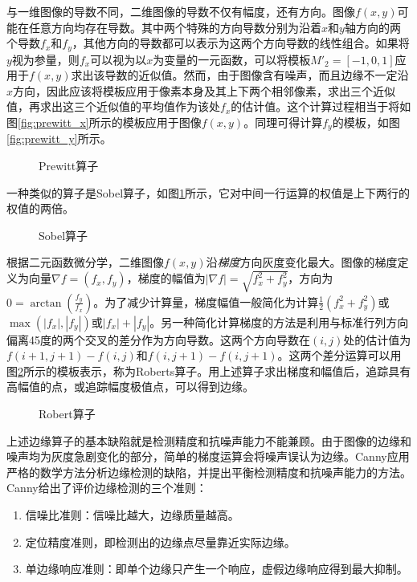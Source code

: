与一维图像的导数不同，二维图像的导数不仅有幅度，还有方向。图像$f(x,y)$可能在任意方向均存在导数。其中两个特殊的方向导数分别为沿着$x$和$y$轴方向的两个导数$f_x$和$f_y$，其他方向的导数都可以表示为这两个方向导数的线性组合。如果将$y$视为参量，则$f_x$可以视为以$x$为变量的一元函数，可以将模板$M'_2=[-1,0,1]$应用于$f(x,y)$求出该导数的近似值。然而，由于图像含有噪声，而且边缘不一定沿$x$方向，因此应该将模板应用于像素本身及其上下两个相邻像素，求出三个近似值，再求出这三个近似值的平均值作为该处$f_x$的估计值。这个计算过程相当于将如图\ref{fig:prewitt_x}所示的模板应用于图像$f(x,y)$。同理可得计算$f_y$的模板，如图\ref{fig:prewitt_y}所示。
\begin{figure}[!h]
  \centering
  \hspace{1cm}
  \caption{Prewitt算子}
\end{figure}
一种类似的算子是Sobel算子，如图\ref{fig:sobel}所示，它对中间一行运算的权值是上下两行的权值的两倍。
\begin{figure}[!h]
  \centering
  \hspace{1cm}
  \caption{Sobel算子}
  \label{fig:sobel}
\end{figure}

根据二元函数微分学，二维图像$f(x,y)$沿\emph{梯度}方向灰度变化最大。图像的梯度定义为向量$\nabla f=(f_x,f_y)$，梯度的幅值为$|\nabla f|=\sqrt{f_x^2+f_y^2}$，方向为$0=\arctan\left(\frac{f_y}{f_x}\right)$。为了减少计算量，梯度幅值一般简化为计算$\frac{1}{2}(f_x^2+f_y^2)$或$\max(|f_x|,|f_y|)$或$|f_x|+|f_y|$。另一种简化计算梯度的方法是利用与标准行列方向偏离45度的两个交叉的差分作为方向导数。这两个方向导数在$(i,j)$处的估计值为$f(i+1,j+1)-f(i,j)$和$f(i,j+1)-f(i,j+1)$。这两个差分运算可以用图\ref{fig:robert}所示的模板表示，称为Roberts算子。用上述算子求出梯度和幅值后，追踪具有高幅值的点，或追踪幅度极值点，可以得到边缘。
\begin{figure}[!h]
  \centering
  \hspace{1cm}
  \caption{Robert算子}
  \label{fig:robert}
\end{figure}

上述边缘算子的基本缺陷就是检测精度和抗噪声能力不能兼顾。由于图像的边缘和噪声均为灰度急剧变化的部分，简单的梯度运算会将噪声误认为边缘。Canny应用严格的数学方法分析边缘检测的缺陷，并提出平衡检测精度和抗噪声能力的方法。Canny给出了评价边缘检测的三个准则：
\begin{enumerate}[(1)]
\item 信噪比准则：信噪比越大，边缘质量越高。
\item  定位精度准则，即检测出的边缘点尽量靠近实际边缘。
\item 单边缘响应准则：即单个边缘只产生一个响应，虚假边缘响应得到最大抑制。
\end{enumerate}

